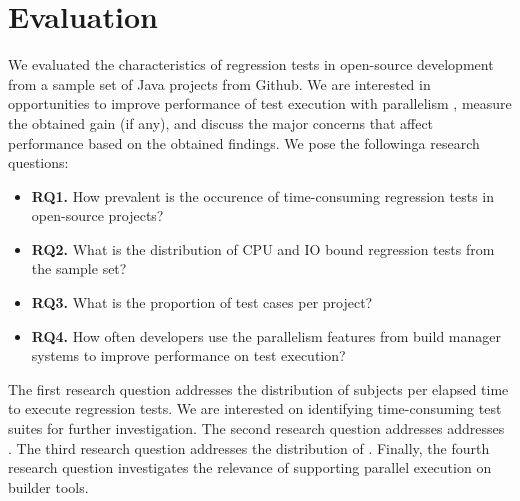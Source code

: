 \section{Evaluation}
\label{sec:eval}


We evaluated the characteristics of regression tests in open-source
development from a sample set of Java projects from Github. We are
interested in opportunities to improve performance of test execution
with parallelism , measure the
obtained gain (if any), and discuss the major concerns that affect
performance based on the obtained findings. We pose the followinga
research questions:

\newcommand{\RQONE}{How prevalent is the occurence of time-consuming
regression tests in open-source projects?}
\newcommand{\RQTWO}{What is the distribution of CPU and IO bound
regression tests from the sample set?}
\newcommand{\RQTHREE}{What is the proportion of \Fix{time-consuming?}
test cases per project?}
\newcommand{\RQFOUR}{How often developers use the parallelism features
from build manager systems to improve performance on test execution?}

\newcommand{\rqA}{\textbf{RQ1.} \RQONE}
\newcommand{\rqB}{\textbf{RQ2.} \RQTWO}
\newcommand{\rqC}{\textbf{RQ3.} \RQTHREE}
\newcommand{\rqD}{\textbf{RQ4.} \RQFOUR}

\begin{itemize}
    \item \rqA
    \item \rqB
    \item \rqC
    \item \rqD
\end{itemize}

The first research question addresses the distribution of subjects per
elapsed time to execute regression tests. We are interested on
identifying time-consuming test suites for further investigation. The
second research question addresses addresses . The third
research question addresses the distribution of . Finally,
the fourth research question investigates the relevance of supporting
parallel execution on builder tools.


